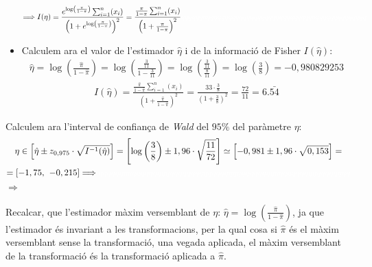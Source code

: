 \documentclass[12pt]{article}
\begin{document}
\begin{itemize}
\begin{multline*}
\Longrightarrow I(\eta)= \frac{e^{\log\left( \frac{\pi}{1-\pi}\right)}\sum_{i=1}^n (x_i)}{\left(1+e^{\log\left( \frac{\pi}{1-\pi}\right)}\right)^2} = \frac{ \frac{\pi}{1-\pi}\sum_{i=1}^n (x_i)}{\left(1+\frac{\pi}{1-\pi}\right)^2}\textcolor{white}{qqqqqqqqqqqqqqqqqqqqqqqqqqqqqqqqqqqqqqqqqqqqqqqqqqq}
\end{multline*}
\item Calculem ara el valor de l'estimador $\hat{\eta}$ i de la informació de Fisher $I(\hat{\eta})$:
\begin{multline*}
\hat{\eta} = \log\left( \frac{\hat{\pi}}{1-\hat{\pi}} \right) = \log\left( \frac{\frac{3}{11}}{1-\frac{3}{11}} \right) = \log\left( \frac{\frac{3}{11}}{\frac{8}{11}} \right) = \log\left( \frac{3}{8} \right) = -0,980829253
\end{multline*}
\begin{multline*}
I(\hat{\eta}) = \frac{ \frac{\hat{\pi}}{1-\hat{\pi}}\sum_{i=1}^n (x_i)}{\left(1+\frac{\hat{\pi}}{1-\hat{\pi}}\right)^2} = \frac{ 33 \cdot \frac{3}{8}}{\left(1+\frac{3}{8}\right)^2} = \frac{72}{11} = 6.\bar{54}
\end{multline*}
\end{itemize}
\newpage
Calculem ara l'interval de confiança de \textit{Wald} del $95\%$ del paràmetre $\eta$:
\begin{multline*}
\eta \in \left[ \hat{\eta} \pm z_{0,975} \cdot \sqrt{I^{-1}(\hat{\eta})} \right] = \left[\log\left( \frac{3}{8} \right) \pm 1,96 \cdot \sqrt{\frac{11}{72}} \right] \simeq \left[-0,981 \pm 1,96 \cdot \sqrt{0,153} \right] = \\
= \left[ -1,75, \hspace{0.4em} -0,215 \right] \Longrightarrow \textcolor{white}{qqqqqqqqqqqqqqqqqqqqqqqqqqqqqqqqqqqqqqqqqqqqqqqqqqqqqqqqqqqq}
\end{multline*}
$\Longrightarrow$\\\\
Recalcar, que l'estimador màxim versemblant de $\eta$: $\hat{\eta}=\log\left( \frac{\hat{\pi}}{1-\hat{\pi}} \right)$, ja que l'estimador és invariant a les transformacions, per la qual cosa si $\hat{\pi}$ és el màxim versemblant sense la transformació, una vegada aplicada, el màxim versemblant de la transformació és la transformació aplicada a $\hat{\pi}$.
\newpage
\end{document}
